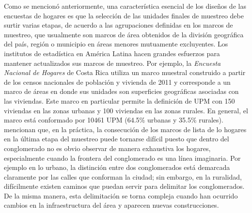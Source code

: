 Como se mencionó anteriormente, una característica esencial de los diseños de las encuestas de hogares es que la selección de las unidades finales de muestreo debe surtir varias etapas, de acuerdo a las agrupaciones definidas en los marcos de muestreo, que usualmente son marcos de área obtenidos de la división geográfica del país, región o municipio en áreas menores mutuamente excluyentes. Los institutos de estadística en América Latina hacen grandes esfuerzos para mantener actualizados sus marcos de muestreo. Por ejemplo, la \emph{Encuesta Nacional de Hogares} de Costa Rica utiliza un marco muestral construido a partir de los censos nacionales de población y vivienda de 2011 y corresponde a un marco de áreas en donde sus unidades son superficies geográficas asociadas con las viviendas. Este marco en particular permite la definición de UPM con 150 viviendas en las zonas urbanas y 100 viviendas en las zonas rurales. En general, el marco está conformado por 10461 UPM (64.5\% urbanas y 35.5\% rurales). \citet{Gambino_Silva_2009} mencionan que, en la práctica, la consecución de los marcos de lista de lo hogares en la última etapa del muestreo puede tornarse difícil puesto que dentro del conglomerado no es obvio observar de manera exhaustiva los hogares, especialmente cuando la frontera del conglomerado es una línea imaginaria. Por ejemplo en lo urbano, la distinción entre dos conglomerados está demarcada claramente por las calles que conforman la ciudad; sin embargo, en la ruralidad, difícilmente existen caminos que puedan servir para delimitar los conglomerados. De la misma manera, esta delimitación se torna compleja cuando han ocurrido cambios en la infraestructura del área y aparecen nuevas construcciones.

